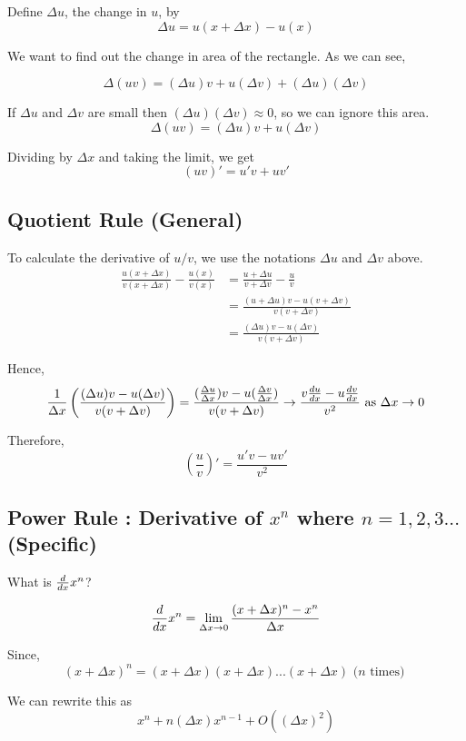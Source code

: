 Define $\Delta u$, the change in $u$, by $$\Delta u = u(x+\Delta x) - u(x)$$

We want to find out the change in area of the rectangle. As we can see, 

$$\Delta(uv) = (\Delta u)v + u(\Delta v) + (\Delta u)(\Delta v)$$

If $\Delta u$ and $\Delta v$ are small then $(\Delta u)(\Delta v) \approx 0$, so we can ignore this area.
$$\Delta(uv) = (\Delta u)v + u(\Delta v)$$

Dividing by $\Delta x$ and taking the limit, we get
$$(uv)' = u'v + uv'$$

\subsection{Quotient Rule (General)}

To calculate the derivative of $u/v$, we use the notations $\Delta u$ and $\Delta v$ above.
\begin{equation*}
\begin{split}
	\frac{u(x+\Delta x)}{v(x+\Delta x)} - \frac{u(x)}{v(x)}
		& = \frac{u + \Delta u}{v + \Delta v} - \frac{u}{v} \\
		& = \frac{(u+\Delta u)v - u(v+\Delta v)}{v(v+\Delta v)} \\
		& = \frac{(\Delta u)v - u(\Delta v)}{v(v+\Delta v)}
\end{split}
\end{equation*}

Hence,
$$
\frac{1}{\Delta x} \left( \frac{(\Delta u)v - u(\Delta v)}{v(v+\Delta v)} \right)
	= \frac{(\frac{\Delta u}{\Delta x})v - u(\frac{\Delta v}{\Delta x})}{v(v+\Delta v)}
	\to \frac{v\frac{d{u}}{d{x}} - u\frac{d{v}}{d{x}}}{v^2} \text{ as } \Delta x \to 0
$$

Therefore, 
$$(\frac{u}{v})' = \frac{u'v - uv'}{v^2}$$



\subsection{Power Rule : Derivative of $x^n$ where $n = 1,2,3...$ (Specific)}

What is $\frac{d{}}{d{x}} x^n$?

$$ \frac{d{}}{d{x}} x^n = \lim_{\Delta x \to 0} \frac{(x+\Delta x)^n - x^n}{\Delta x} $$

Since, $$ (x+\Delta x)^n = (x+\Delta x)(x+\Delta x)...(x+\Delta x) \text{ ($n$ times) } $$

We can rewrite this as $$ x^n + n(\Delta x)x^{n-1} + O((\Delta x)^2) $$

